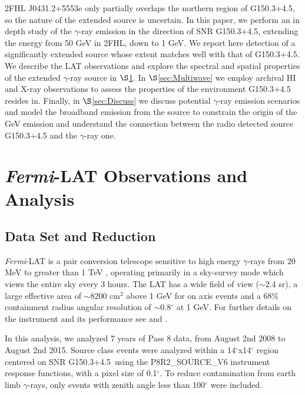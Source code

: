 \documentclass[iop]{emulateapj}
\newcommand{\gam}{$\gamma$-ray}
\newcommand{\FermiLat}{\emph{Fermi}-LAT }     %
\newcommand{\Gone}{G150.3+4.5}
\begin{document}
2FHL J0431.2+5553e only partially overlaps the northern region of \Gone{}, so the nature of the extended source is uncertain. In this paper, we perform an in depth study of the \gam{} emission in the direction of SNR \Gone{}, extending the energy from 50 GeV in 2FHL, down to 1 GeV.  We report here  detection of  a significantly extended source whose extent matches well with that of \Gone{}. We describe the LAT observations and explore the spectral and spatial properties of the extended \gam{} source in $\S$\ref{sec:LATobs}. In $\S$\ref{sec:Multiwave} we employ archival HI and X-ray observations to assess the properties of the environment \Gone{} resides in. Finally, in $\S$\ref{sec:Discuss} we discuss potential \gam{} emission scenarios and model the broadband emission from the source to constrain the origin of the GeV emission and understand the connection between the radio detected source \Gone{} and the \gam{} one.

%
%
\section{\FermiLat  Observations and  Analysis }\label{sec:LATobs}
\subsection{Data Set and Reduction}\label{sec:LATdata}
\FermiLat is a pair conversion telescope sensitive to high energy \gam{}s  from 20 MeV to greater than 1 TeV \citep{2FHL}, operating primarily in a sky-survey mode which views  the entire sky every 3 hours. The LAT has a wide field of view ($\sim$2.4 sr), a large effective area of $\sim$8200 cm$^2$ above 1 GeV for on axis events and a  68\% containment radius angular resolution  of $\sim$0.8$^\circ$  at 1 GeV. For further details  on the instrument and its performance see \cite{atwood09} and \cite{lat_perf}.

In this analysis, we  analyzed 7 years of Pass 8 data, from August 2nd 2008  to August 2nd 2015. Source class events were analyzed within a 14$^\circ$x14$^\circ$ region centered on SNR \Gone~using the P8R2\_SOURCE\_V6 instrument response functions, with a pixel size of 0.1$^{\circ}$. To reduce contamination from earth limb \gam{}s, only events with zenith angle less than 100$^{\circ}$ were included.
\end{document}

